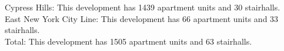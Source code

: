 {Cypress Hills}: This development has 1439 apartment units and 30 stairhalls.\\{East New York City Line}: This development has 66 apartment units and 33 stairhalls.\\{Total}: This development has 1505 apartment units and 63 stairhalls.\\